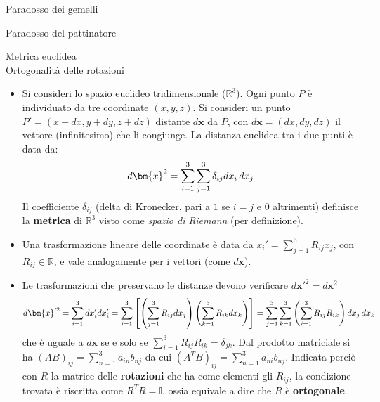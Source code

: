 \documentclass[a4_2,grid,frame]{flashcards}
\newenvironment{cartaflash}
    {\vspace{-15pt}
    \begin{itemize}
    }
    {
    \end{itemize}
    }
\begin{document}
\begin{flashcard}[Paradosso]{Paradosso dei gemelli}

\end{flashcard}

\begin{flashcard}[Paradosso]{Paradosso del pattinatore}

\end{flashcard}

\begin{flashcard}[Proprietà]{Metrica euclidea\\Ortogonalità delle rotazioni}
\begin{cartaflash}
\item Si consideri lo spazio euclideo tridimensionale ($\mathbb{R}^3$). Ogni punto $P$ è individuato da tre coordinate $(x,y,z)$. Si consideri un punto $P' = (x+dx, y+dy, z+dz)$ distante $d\bm{x}$ da $P$, con $d\bm{x} = (dx, dy, dz)$ il vettore (infinitesimo) che li congiunge. La distanza euclidea tra i due punti è data da:
\vspace{-13pt}
\[
d\bm{x}^2 = \sum_{i=1}^3 \sum_{j=1}^3 \delta_{ij}dx_i\,dx_j
\vspace{-8pt}
\]
Il coefficiente $\delta_{ij}$ (delta di Kronecker, pari a $1$ se $i=j$ e $0$ altrimenti) definisce la \textbf{metrica} di $\mathbb{R}^3$ visto come \textit{spazio di Riemann} (per definizione).
\vspace{-8pt}
\item Una trasformazione lineare delle coordinate è data da $x_i' = \sum_{j=1}^3 R_{ij} x_j$, con $R_{ij} \in \mathbb{R}$, e vale analogamente per i vettori (come $d\bm{x}$). 
\vspace{-8pt}
\item Le trasformazioni che preservano le distanze devono verificare $d\bm{x}'^2 = d\bm{x}^2$
\vspace{-8pt}
\[
d\bm{x}'^2 = \sum\limits_{i=1}^3 dx_i' dx_i' = \sum_{i=1}^3\left [\left (\sum_{j=1}^3 R_{ij}dx_j \right) \left (\sum_{k=1}^3 R_{ik}dx_k \right ) \right ] = \sum_{j=1}^3\sum_{k=1}^3 \left ( \sum_{i=1}^3 R_{ij}R_{ik} \right ) dx_j\,dx_k
\vspace{-8pt}
\]
che è uguale a $d\bm{x}$ se e solo se $\sum_{i=1}^3 R_{ij} R_{ik} = \delta_{jk}$. Dal prodotto matriciale si ha $(AB)_{ij} = \sum_{n=1}^3 a_{in}b_{nj}$ da cui $(A^T B)_{ij} = \sum_{n=1}^3 a_{ni}b_{nj}$. Indicata perciò con $R$ la matrice delle \textbf{rotazioni} che ha come elementi gli $R_{ij}$, la condizione trovata è riscritta come $R^T R = \mathbb{I}$, ossia equivale a dire che $R$ è \textbf{ortogonale}. 
\end{cartaflash}
\end{flashcard}
\end{document}
